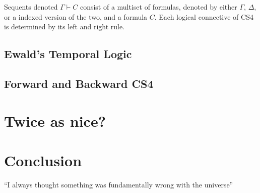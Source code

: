 \documentclass{article}
\begin{document}
Sequents denoted $\Gamma \vdash C$ consist of a multiset of formulas, denoted by either $\Gamma$, $\Delta$, or a indexed version of the two, and a formula $C$.  Each logical connective of CS4 is determined by its left and right rule.

\subsection{Ewald's Temporal Logic}
\subsection{Forward and Backward CS4}
\section{Twice as nice?}


\section{Conclusion}
``I always thought something was fundamentally wrong with the universe'' 



\end{document}
